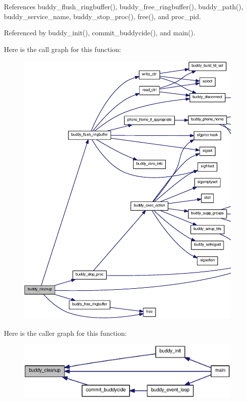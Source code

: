 References buddy\_\-flush\_\-ringbuffer(), buddy\_\-free\_\-ringbuffer(), buddy\_\-path(), buddy\_\-service\_\-name, buddy\_\-stop\_\-proc(), free(), and proc\_\-pid.



Referenced by buddy\_\-init(), commit\_\-buddycide(), and main().



Here is the call graph for this function:
\nopagebreak
\begin{figure}[H]
\begin{center}
\leavevmode
\includegraphics[width=400pt]{buddy_8c_ae71e6bfc3369a9182bd124873f3c4c54_cgraph}
\end{center}
\end{figure}




Here is the caller graph for this function:\nopagebreak
\begin{figure}[H]
\begin{center}
\leavevmode
\includegraphics[width=400pt]{buddy_8c_ae71e6bfc3369a9182bd124873f3c4c54_icgraph}
\end{center}
\end{figure}


